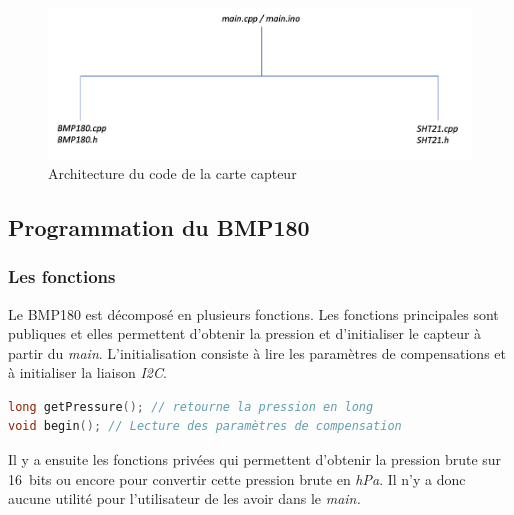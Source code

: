             \clearpage

            \begin{figure}[!h]
                \begin{center}
                    \includegraphics[width=.8\textwidth]{img/code/archi_sensor.png}
                    \caption{\label{fig:archi_sensor}Architecture du code de la carte capteur}  
                \end{center}
            \end{figure}

        \subsection{Programmation du BMP180}
            \noindent
            \subsubsection{Les fonctions}

            \vspace{.2cm}

            Le BMP180 est décomposé en plusieurs fonctions. Les fonctions principales sont publiques et elles permettent d'obtenir la pression et d'initialiser le capteur à partir du \textit{main}. L'initialisation consiste à lire les 
            paramètres de compensations et à initialiser la liaison \textit{I2C}.

\begin{lstlisting}[style=myC, caption=Fonctions publiques de la librairie BMP180, language=C, frame=lines]
long getPressure(); // retourne la pression en long
void begin(); // Lecture des paramètres de compensation
\end{lstlisting}

        \vspace{.5 cm}

        Il y a ensuite les fonctions privées qui permettent d'obtenir la pression brute sur 16~bits ou encore pour convertir cette pression brute en \textit{hPa}. Il n'y a donc aucune utilité pour l'utilisateur de les avoir dans le \textit{main.}

